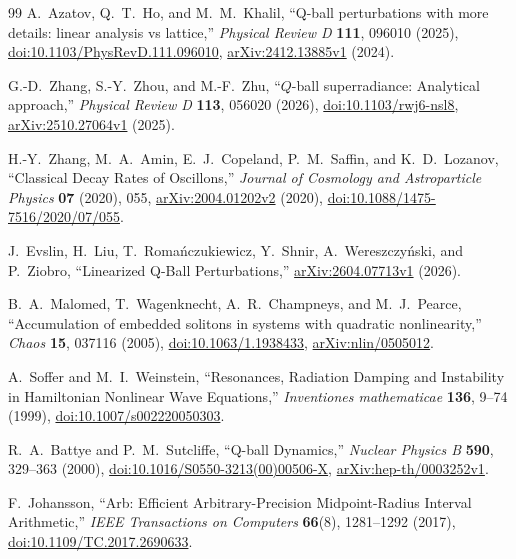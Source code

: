 \begin{thebibliography}{99}
A.~Azatov, Q.~T.~Ho, and M.~M.~Khalil,
``Q-ball perturbations with more details: linear analysis vs lattice,''
\emph{Physical Review D} \textbf{111}, 096010 (2025),
\href{https://doi.org/10.1103/PhysRevD.111.096010}{doi:10.1103/PhysRevD.111.096010},
\href{https://arxiv.org/abs/2412.13885v1}{arXiv:2412.13885v1} (2024).

G.-D.~Zhang, S.-Y.~Zhou, and M.-F.~Zhu,
``$Q$-ball superradiance: Analytical approach,''
\emph{Physical Review D} \textbf{113}, 056020 (2026),
\href{https://doi.org/10.1103/rwj6-nsl8}{doi:10.1103/rwj6-nsl8},
\href{https://arxiv.org/abs/2510.27064v1}{arXiv:2510.27064v1} (2025).

H.-Y.~Zhang, M.~A.~Amin, E.~J.~Copeland, P.~M.~Saffin, and K.~D.~Lozanov,
``Classical Decay Rates of Oscillons,''
\emph{Journal of Cosmology and Astroparticle Physics} \textbf{07} (2020), 055,
\href{https://arxiv.org/abs/2004.01202v2}{arXiv:2004.01202v2} (2020),
\href{https://doi.org/10.1088/1475-7516/2020/07/055}{doi:10.1088/1475-7516/2020/07/055}.

J.~Evslin, H.~Liu, T.~Roma\'nczukiewicz, Y.~Shnir,
A.~Wereszczy\'nski, and P.~Ziobro,
``Linearized Q-Ball Perturbations,''
\href{https://arxiv.org/abs/2604.07713v1}{arXiv:2604.07713v1} (2026).

B.~A.~Malomed, T.~Wagenknecht, A.~R.~Champneys, and M.~J.~Pearce,
``Accumulation of embedded solitons in systems with quadratic nonlinearity,''
\emph{Chaos} \textbf{15}, 037116 (2005),
\href{https://doi.org/10.1063/1.1938433}{doi:10.1063/1.1938433},
\href{https://arxiv.org/abs/nlin/0505012}{arXiv:nlin/0505012}.

A.~Soffer and M.~I.~Weinstein,
``Resonances, Radiation Damping and Instability in Hamiltonian Nonlinear Wave Equations,''
\emph{Inventiones mathematicae} \textbf{136}, 9--74 (1999),
\href{https://doi.org/10.1007/s002220050303}{doi:10.1007/s002220050303}.

R.~A.~Battye and P.~M.~Sutcliffe,
``Q-ball Dynamics,'' \emph{Nuclear Physics B} \textbf{590}, 329--363 (2000),
\href{https://doi.org/10.1016/S0550-3213(00)00506-X}{doi:10.1016/S0550-3213(00)00506-X},
\href{https://arxiv.org/abs/hep-th/0003252v1}{arXiv:hep-th/0003252v1}.

F.~Johansson, ``Arb: Efficient Arbitrary-Precision Midpoint-Radius
Interval Arithmetic,'' \emph{IEEE Transactions on Computers}
\textbf{66}(8), 1281--1292 (2017),
\href{https://doi.org/10.1109/TC.2017.2690633}{doi:10.1109/TC.2017.2690633}.


\end{thebibliography}
